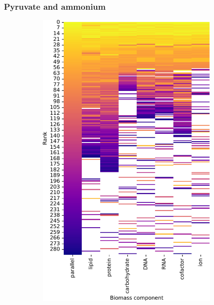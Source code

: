 \subsubsection{Pyruvate and ammonium}
\label{subsec:model-rank-pyruvate}

\begin{figure}
  \centering
  \begin{subfigure}[t]{0.45\textwidth}
  \centering
    \includegraphics[width=\linewidth]{CompareEnzUse_glc00p00_pyr08p89_ammUnres_1.pdf}
    \caption{
    }
    \label{fig:model-rank-pyr-lowratio-rank}
  \end{subfigure}%

\end{figure}
